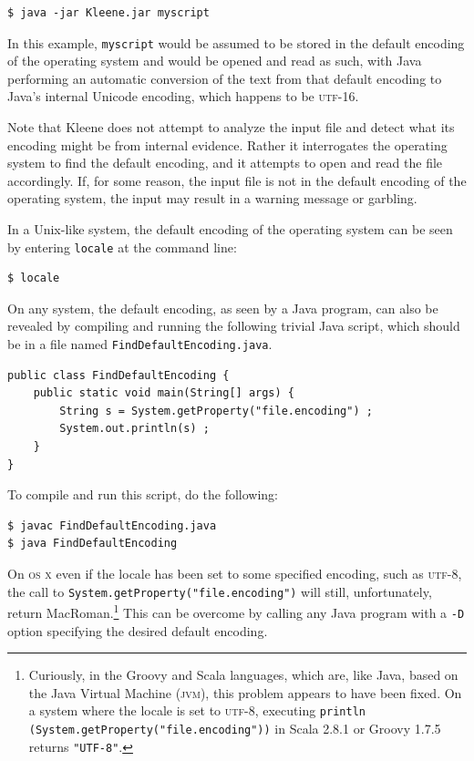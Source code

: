 \documentclass[letterpaper,12pt]{article}
\newcommand{\acro}{\textsc}
\begin{document}
\begin{Verbatim}[fontsize=\small]
$ java -jar Kleene.jar myscript
\end{Verbatim}

\noindent
In this example, \texttt{myscript} would be assumed to be stored in the default encoding
of the operating system and would be opened and read as such, with Java performing
an automatic conversion of the text from that default encoding to Java's internal
Unicode encoding, which happens to be \acro{utf}-16.

Note that Kleene does not attempt to analyze the input file and detect what its encoding
might be from internal evidence.  Rather it interrogates the operating system to
find the default encoding, and it attempts to open and read the file accordingly.  If, for some reason,
the input file is not in the default encoding of the operating system, the input
may result in a warning message or garbling.

In a Unix-like system, the default encoding of the operating system can be seen by
entering \texttt{locale} at the command line:

\begin{Verbatim}[fontsize=\small]
$ locale
\end{Verbatim}

\noindent
On any system, the default encoding, as seen by a Java program, can also be revealed by compiling
and running the following trivial Java script, which should be in a file named
\texttt{FindDefaultEncoding.java}.

\begin{Verbatim}[fontsize=\small]
public class FindDefaultEncoding {
    public static void main(String[] args) {
        String s = System.getProperty("file.encoding") ;
        System.out.println(s) ;
    }
}
\end{Verbatim}

\noindent
To compile and run this script, do the following:

\begin{Verbatim}[fontsize=\small]
$ javac FindDefaultEncoding.java
$ java FindDefaultEncoding
\end{Verbatim}

On \acro{os x} even if the locale has been set to some specified
encoding, such as \acro{utf-8}, the call to
\verb!System.getProperty("file.encoding")! will still, unfortunately,
return MacRoman.\footnote{Curiously, in the Groovy and Scala
languages, which are, like Java, based on the Java Virtual Machine
(\acro{jvm}), this problem appears to have been fixed.  On a
system where the locale is set to \acro{utf-8}, executing
\texttt{println (System.getProperty("file.encoding"))} in Scala
2.8.1 or Groovy 1.7.5 returns \verb!"UTF-8"!.}  This can be overcome by calling any Java program with a
\verb!-D! option specifying the desired default
encoding.
\end{document}
